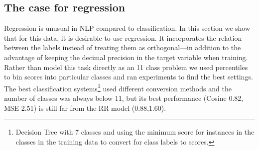 \documentclass[11pt,letterpaper]{article}
\begin{document}
\begin{table}[ht!]
\caption{Cosine Test Results Breakdown.}
\label{tbl:submissionsCosineBreakdown}
\end{table}

\subsection{The case for regression} 
\label{subsec:forregression}
Regression is unusual in NLP compared to classification. In this section we show that for this data, it is desirable to use regression. %
It incorporates the relation between the labels instead of treating them as orthogonal---in addition to the advantage of keeping the decimal precision in the target variable when training.
Rather than model this task directly as an 11 class problem we used percentiles to bin scores into particular classes and ran experiments to find the best settings. %
The best classification systems\footnote{Decision Tree with 7 classes and using the minimum score for instances in the classes in the training data to convert for class labels to scores.}  used different conversion methods and the number of classes was always below 11, but its best performance (Cosine 0.82, MSE 2.51) is still far from the {\sc RR} model (0.88,1.60).  
\end{document}
